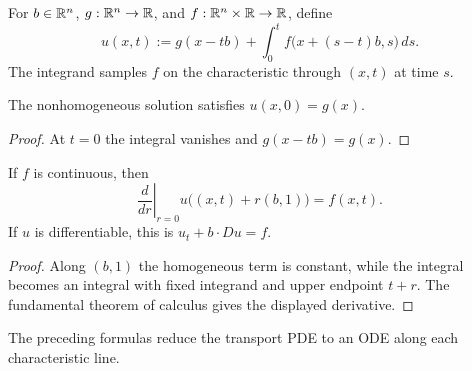 \begin{definition}
\label{def:transport-nonhom-solution}





For $b\in\mathbb{R}^n$, $g:\mathbb{R}^n\to\mathbb{R}$, and $f:\mathbb{R}^n\times\mathbb{R}\to\mathbb{R}$, define
$$u(x,t):=g(x-tb)+\int_0^t f\bigl(x+(s-t)b,s\bigr)\,ds.$$
The integrand samples $f$ on the characteristic through $(x,t)$ at time $s$.
\end{definition}

\begin{theorem}
\label{thm:transport-nonhom-initial-condition}





The nonhomogeneous solution satisfies $u(x,0)=g(x)$.
\end{theorem}
\begin{proof}

\sketch At $t=0$ the integral vanishes and $g(x-tb)=g(x)$.
\end{proof}

\begin{theorem}
\label{thm:transport-nonhom-solves}





If $f$ is continuous, then
$$\left.\frac{d}{dr}\right|_{r=0}u\bigl((x,t)+r(b,1)\bigr)=f(x,t).$$
If $u$ is differentiable, this is $u_t+b\cdot Du=f$.
\end{theorem}
\begin{proof}

\sketch Along $(b,1)$ the homogeneous term is constant, while the integral
becomes an integral with fixed integrand and upper endpoint $t+r$. The
fundamental theorem of calculus gives the displayed derivative.
\end{proof}

\begin{remark}
\label{rem:transport-equation-method-of-characteristics}
The preceding formulas reduce the transport PDE to an ODE along each
characteristic line.
\end{remark}

